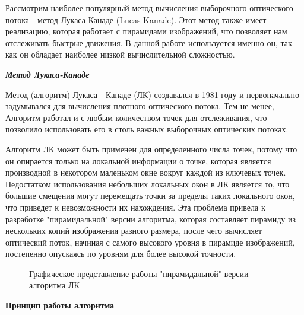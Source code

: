 Рассмотрим наиболее популярный метод вычисления выборочного оптического потока - метод Лукаса-Канаде (Lucas-Kanade). Этот метод также имеет реализацию, которая работает с пирамидами изображений, что позволяет нам отслеживать быстрые движения. В данной работе используется именно он, так как он обладает наиболее низкой вычислительной сложностью. 

{\large \textit{\textbf{Метод Лукаса-Канаде}}}
\label{label:lucas-kanade-math}

Метод (алгоритм) Лукаса - Канаде (ЛК) создавался в 1981 году и первоначально задумывался для вычисления плотного оптического потока. Тем не менее, Алгоритм работал и с любым количеством точек для отслеживания, что позволило использовать его в столь важных выборочных оптических потоках. 

Алгоритм ЛК может быть применен для определенного числа точек, потому что он опирается только на локальной информации о точке, которая является производной в некотором маленьком окне вокруг каждой из ключевых точек. Недостатком использования небольших локальных окон в ЛК является то, что большие смещения могут перемещать точки за пределы таких локального окон, что приведет к невозможности их нахождения. Эта проблема привела к разработке "пирамидальной" версии алгоритма, которая составляет пирамиду из нескольких копий изображения разного размера, после чего вычисляет оптический поток, начиная с самого высокого уровня в пирамиде изображений, постепенно опускаясь по уровням для более высокой точности. 

\begin{figure}[!htb]
\caption{Графическое представление работы "пирамидальной" версии алгоритма ЛК}
\label{pic:pyrLK}
\end{figure}

\textbf{Принцип работы алгоритма}

